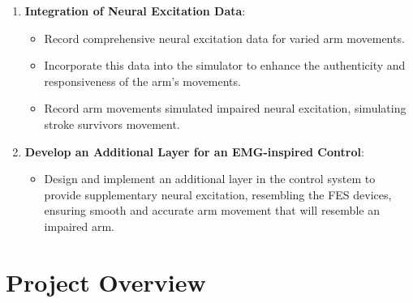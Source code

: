 \begin{enumerate}
    \item \textbf{Integration of Neural Excitation Data}:
    \begin{itemize}
        \item Record comprehensive neural excitation data for varied arm movements.
        \item Incorporate this data into the simulator to enhance the authenticity and responsiveness of the arm's movements.
        \item Record arm movements simulated impaired neural excitation, simulating stroke survivors movement.
    \end{itemize}
    
    \item \textbf{Develop an Additional Layer for an EMG-inspired Control}:
    \begin{itemize}
        \item Design and implement an additional layer in the control system to provide supplementary neural excitation, resembling the FES devices, ensuring smooth and accurate arm movement that will resemble an impaired arm.
    \end{itemize}
\end{enumerate}

\section{Project Overview}